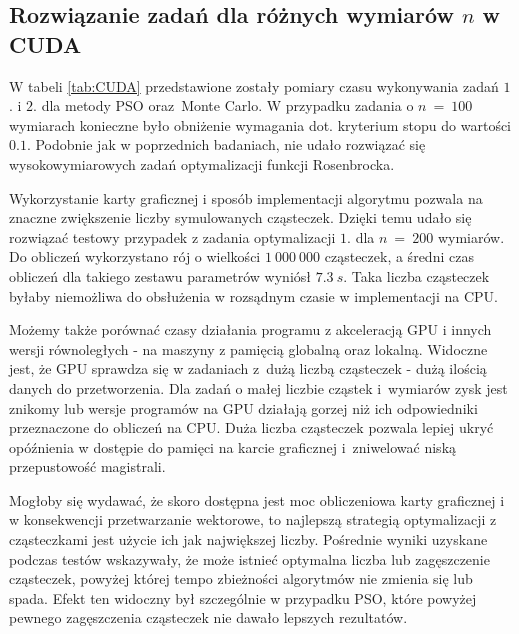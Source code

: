 \documentclass[11pt, a4paper, oneside]{article}
\begin{document}
\subsection{Rozwiązanie zadań dla różnych wymiarów $n$ w CUDA} \label{sec:table:cuda}
W tabeli \ref{tab:CUDA} przedstawione zostały pomiary czasu wykonywania zadań $1$. i $2$. dla metody PSO oraz~Monte Carlo. W przypadku zadania o $n \ = \ 100$ wymiarach konieczne było obniżenie wymagania dot. kryterium stopu do wartości $0.1$. Podobnie jak w poprzednich badaniach, nie udało rozwiązać się wysokowymiarowych zadań optymalizacji funkcji Rosenbrocka.

Wykorzystanie karty graficznej i sposób implementacji algorytmu pozwala na znaczne zwiększenie liczby symulowanych cząsteczek. Dzięki temu udało się rozwiązać testowy przypadek z zadania optymalizacji $1.$ dla $n \ = \ 200$ wymiarów. Do obliczeń wykorzystano rój o wielkości $1 \ 000 \ 000$ cząsteczek, a średni czas obliczeń dla takiego zestawu parametrów wyniósł $7.3 \ s$. Taka liczba cząsteczek byłaby niemożliwa do obsłużenia w rozsądnym czasie w implementacji na CPU.

Możemy także porównać czasy działania programu z akceleracją GPU i innych wersji równoległych - na maszyny z pamięcią globalną oraz lokalną. Widoczne jest, że GPU sprawdza się w zadaniach z~dużą liczbą cząsteczek - dużą ilością danych do przetworzenia. Dla zadań o małej liczbie cząstek i~wymiarów zysk jest znikomy lub wersje programów na GPU działają gorzej niż ich odpowiedniki przeznaczone do obliczeń na CPU. Duża liczba cząsteczek pozwala lepiej ukryć opóźnienia w dostępie do pamięci na karcie graficznej i~zniwelować niską przepustowość magistrali.

Mogłoby się wydawać, że skoro dostępna jest moc obliczeniowa karty graficznej i w konsekwencji przetwarzanie wektorowe, to najlepszą strategią optymalizacji z cząsteczkami jest użycie ich jak największej liczby. Pośrednie wyniki uzyskane podczas testów wskazywały, że może istnieć optymalna liczba lub zagęszczenie cząsteczek, powyżej której tempo zbieżności algorytmów nie zmienia się lub spada. Efekt ten widoczny był szczególnie w przypadku PSO, które powyżej pewnego zagęszczenia cząsteczek nie dawało lepszych rezultatów.
\end{document}
